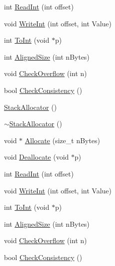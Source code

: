 \begin{DoxyCompactItemize}
\item 
int \mbox{\hyperlink{classROOT_1_1Minuit2_1_1StackAllocator_a811df825be4e6f67dc5a9139eb2edfdd}{Read\+Int}} (int offset)
\item 
void \mbox{\hyperlink{classROOT_1_1Minuit2_1_1StackAllocator_a1f87ef34658b74aa3fff9abd1cd1094e}{Write\+Int}} (int offset, int Value)
\item 
int \mbox{\hyperlink{classROOT_1_1Minuit2_1_1StackAllocator_a8c8afb9902a08eec0ec7c863636694e5}{To\+Int}} (void $\ast$p)
\item 
int \mbox{\hyperlink{classROOT_1_1Minuit2_1_1StackAllocator_ab40fb208cf8d4c0b3edf51137672c3d1}{Aligned\+Size}} (int n\+Bytes)
\item 
void \mbox{\hyperlink{classROOT_1_1Minuit2_1_1StackAllocator_a96a7565f7b4bb269f740901eef54a97e}{Check\+Overflow}} (int n)
\item 
bool \mbox{\hyperlink{classROOT_1_1Minuit2_1_1StackAllocator_ad1189cdc76a07c36ef1924ad2488797d}{Check\+Consistency}} ()
\item 
\mbox{\hyperlink{classROOT_1_1Minuit2_1_1StackAllocator_a4fe80b380d5a1d1a58bb916d9aa47e29}{Stack\+Allocator}} ()
\item 
\mbox{\hyperlink{classROOT_1_1Minuit2_1_1StackAllocator_ac1f5e9946a42290da68e86edf84cc528}{$\sim$\+Stack\+Allocator}} ()
\item 
void $\ast$ \mbox{\hyperlink{classROOT_1_1Minuit2_1_1StackAllocator_a1fb4d1744055446776080af229679e03}{Allocate}} (size\+\_\+t n\+Bytes)
\item 
void \mbox{\hyperlink{classROOT_1_1Minuit2_1_1StackAllocator_ac36426e01e1474491cef1b203dba2f0c}{Deallocate}} (void $\ast$p)
\item 
int \mbox{\hyperlink{classROOT_1_1Minuit2_1_1StackAllocator_a811df825be4e6f67dc5a9139eb2edfdd}{Read\+Int}} (int offset)
\item 
void \mbox{\hyperlink{classROOT_1_1Minuit2_1_1StackAllocator_a1f87ef34658b74aa3fff9abd1cd1094e}{Write\+Int}} (int offset, int Value)
\item 
int \mbox{\hyperlink{classROOT_1_1Minuit2_1_1StackAllocator_a8c8afb9902a08eec0ec7c863636694e5}{To\+Int}} (void $\ast$p)
\item 
int \mbox{\hyperlink{classROOT_1_1Minuit2_1_1StackAllocator_ab40fb208cf8d4c0b3edf51137672c3d1}{Aligned\+Size}} (int n\+Bytes)
\item 
void \mbox{\hyperlink{classROOT_1_1Minuit2_1_1StackAllocator_a96a7565f7b4bb269f740901eef54a97e}{Check\+Overflow}} (int n)
\item 
bool \mbox{\hyperlink{classROOT_1_1Minuit2_1_1StackAllocator_ad1189cdc76a07c36ef1924ad2488797d}{Check\+Consistency}} ()
\end{DoxyCompactItemize}


